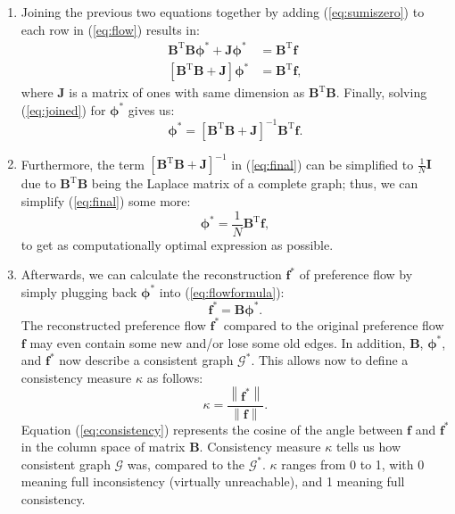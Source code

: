 \documentclass[letterpaper, 10 pt, conference]{ieeeconf}
\newcommand{\matr}[1]{\mathbold{#1}}
\newcommand{\graph}[1]{\mathcal{#1}}
\newcommand{\T}{\mathrm{T}}
\begin{document}
\begin{enumerate}
    \item Joining the previous two equations together by adding (\ref{eq:sumiszero}) to each row in (\ref{eq:flow}) results in:
    \begin{align}
    \matr{B}^\T \matr{B} \matr{\phi^*} + \matr{J} \matr{\phi^*} &= \matr{B}^\T \matr{f} \nonumber \\
    \label{eq:joined}
    \left[\matr{B}^\T \matr{B} + \matr{J} \right] \matr{\phi^*} &= \matr{B}^\T \matr{f},
    \end{align}
    where $\matr{J}$ is a matrix of ones with same dimension as $\matr{B}^\T \matr{B}$.
    Finally, solving (\ref{eq:joined}) for $\matr{\phi^*}$ gives us:
    \begin{equation}
    \label{eq:final}
    \matr{\phi^*} = \left[\matr{B}^\T \matr{B} + \matr{J} \right]^{-1} \matr{B}^\T \matr{f}.
    \end{equation}
    \item Furthermore, the term $\left[ \matr{B}^\T \matr{B} + \matr{J} \right]^{-1}$ in (\ref{eq:final}) can be simplified to $\frac{1}{N} \matr{I}$ due to $\matr{B}^\T \matr{B}$ being the Laplace matrix of a complete graph; thus, we can simplify (\ref{eq:final}) some more:
    \begin{equation}
    \matr{\phi^*} = \frac{1}{N} \matr{B}^\T \matr{f},
    \end{equation}
    to get as computationally optimal expression as possible.
    
    \item Afterwards, we can calculate the reconstruction $\matr{f}^*$ of preference  flow by simply plugging back $\matr{\phi^*}$ into (\ref{eq:flowformula}):
    \begin{equation}
    \matr{f^*} = \matr{B} \matr{\phi^*}.
    \end{equation}
    The reconstructed preference flow $\matr{f^*}$ compared to the original preference flow $\matr{f}$ may even contain some new and/or lose some old edges.
    In addition, $\matr{B}$, $\matr{\phi^*}$, and $\matr{f^*}$ now describe a consistent graph $\graph{G}^*$.
    This allows now to define a consistency measure $\kappa$ as follows:
    \begin{equation}
    \label{eq:consistency}
    \kappa = \frac{\left \lVert \matr{f^*} \right \rVert}{\left \lVert \matr{f} \right \rVert}.
    \end{equation}
    Equation (\ref{eq:consistency}) represents the cosine of the angle between $\matr{f}$ and $\matr{f^*}$ in the column space of matrix $\matr{B}$.
    Consistency measure $\kappa$ tells us how consistent graph $\graph{G}$ was, compared to the $\graph{G}^*$.
    $\kappa$ ranges from 0 to 1, with 0 meaning full inconsistency (virtually unreachable), and 1 meaning full consistency.
    
  \end{enumerate}
  
\end{document}
